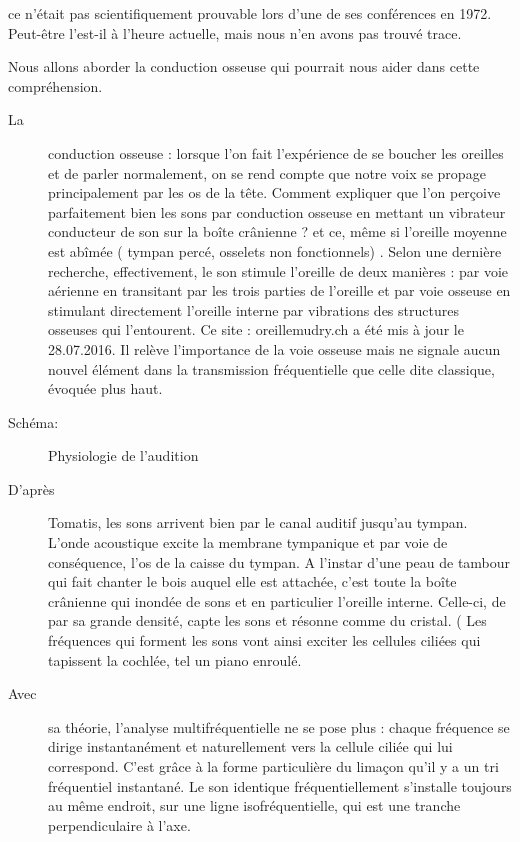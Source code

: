 ce n'était pas scientifiquement prouvable lors d'une de ses conférences
en 1972. Peut-être l'est-il à l'heure actuelle, mais nous n'en avons
pas trouvé trace. 

Nous allons aborder la conduction osseuse qui pourrait nous aider
dans cette compréhension.
\begin{description}
\item [{La}] conduction osseuse : lorsque l'on fait l'expérience de se
boucher les oreilles et de parler normalement, on se rend compte que
notre voix se propage principalement par les os de la tête. Comment
expliquer que l'on perçoive parfaitement bien les sons par conduction
osseuse en mettant un vibrateur conducteur de son sur la boîte crânienne
? et ce, même si l'oreille moyenne est abîmée ( tympan percé, osselets
non fonctionnels) . Selon une dernière recherche, effectivement, le
son stimule l'oreille de deux manières : par voie aérienne en transitant
par les trois parties de l'oreille et par voie osseuse en stimulant
directement l'oreille interne par vibrations des structures osseuses
qui l'entourent. Ce site : oreillemudry.ch a été mis à jour le 28.07.2016.
Il relève l'importance de la voie osseuse mais ne signale aucun nouvel
élément dans la transmission fréquentielle que celle dite classique,
évoquée plus haut. 
\item [{Schéma:}] Physiologie de l\textquoteright audition 
\item [{D'après}] Tomatis, les sons arrivent bien par le canal auditif
jusqu'au tympan. L'onde acoustique excite la membrane tympanique et
par voie de conséquence, l'os de la caisse du tympan. A l'instar d'une
peau de tambour qui fait chanter le bois auquel elle est attachée,
c'est toute la boîte crânienne qui inondée de sons et en particulier
l'oreille interne. Celle-ci, de par sa grande densité, capte les sons
et résonne comme du cristal. (
Les fréquences qui forment les sons vont ainsi exciter les cellules
ciliées qui tapissent la cochlée, tel un piano enroulé. 
\item [{Avec}] sa théorie, l'analyse multifréquentielle ne se pose plus
: chaque fréquence se dirige instantanément et naturellement\emph{
}vers la cellule ciliée qui lui correspond. C'est grâce à la forme
particulière\emph{ }du limaçon qu'il y a un tri fréquentiel instantané.
Le son identique fréquentiellement s'installe toujours au même endroit,
sur une ligne isofréquentielle, qui est une tranche perpendiculaire
à l'axe.
\end{description}
